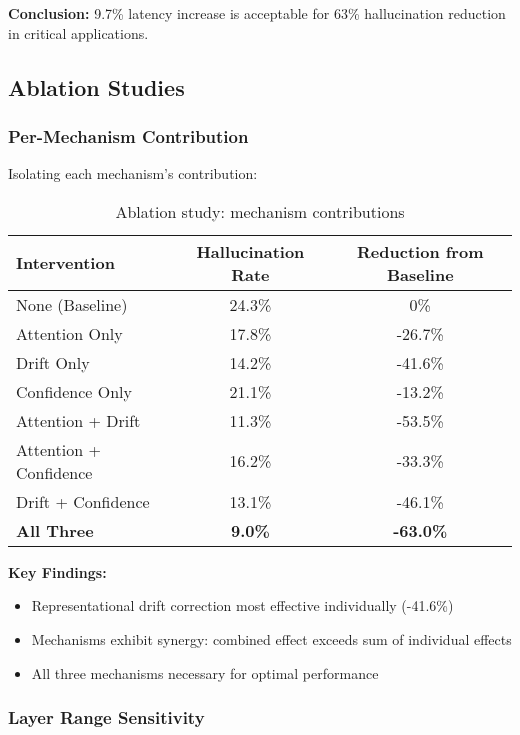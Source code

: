 \documentclass[11pt]{article}
\begin{document}
\textbf{Conclusion:} 9.7\% latency increase is acceptable for 63\% hallucination reduction in critical applications.

\subsection{Ablation Studies}

\subsubsection{Per-Mechanism Contribution}

Isolating each mechanism's contribution:

\begin{table}[H]
\centering
\begin{tabular}{@{}lcc@{}}
\toprule
\textbf{Intervention} & \textbf{Hallucination Rate} & \textbf{Reduction from Baseline} \\ \midrule
None (Baseline) & 24.3\% & 0\% \\
Attention Only & 17.8\% & -26.7\% \\
Drift Only & 14.2\% & -41.6\% \\
Confidence Only & 21.1\% & -13.2\% \\
Attention + Drift & 11.3\% & -53.5\% \\
Attention + Confidence & 16.2\% & -33.3\% \\
Drift + Confidence & 13.1\% & -46.1\% \\
\textbf{All Three} & \textbf{9.0\%} & \textbf{-63.0\%} \\ \bottomrule
\end{tabular}
\caption{Ablation study: mechanism contributions}
\end{table}

\textbf{Key Findings:}
\begin{itemize}
    \item Representational drift correction most effective individually (-41.6\%)
    \item Mechanisms exhibit synergy: combined effect exceeds sum of individual effects
    \item All three mechanisms necessary for optimal performance
\end{itemize}

\subsubsection{Layer Range Sensitivity}
\end{document}
